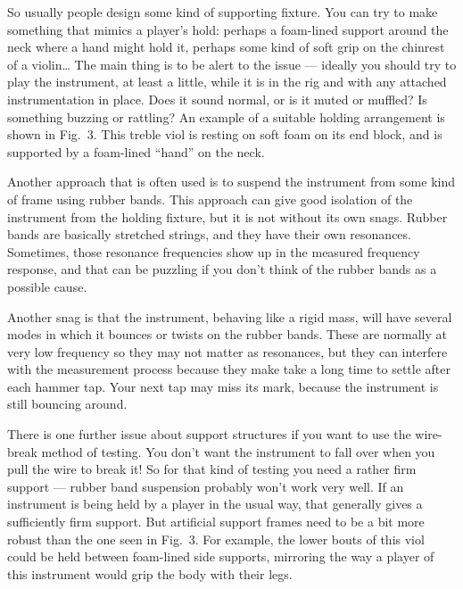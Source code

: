   So usually people design some kind of supporting fixture. You can try to make 
  something that mimics a player’s hold: perhaps a foam-lined support around 
  the neck where a hand might hold it, perhaps some kind of soft grip on the 
  chinrest of a violin… The main thing is to be alert to the issue — ideally 
  you should try to play the instrument, at least a little, while it is in the 
  rig and with any attached instrumentation in place. Does it sound normal, or 
  is it muted or muffled? Is something buzzing or rattling? An example of a 
  suitable holding arrangement is shown in Fig.\ 3. This treble viol is resting 
  on soft foam on its end block, and is supported by a foam-lined ``hand'' on 
  the neck. 


  Another approach that is often used is to suspend the instrument from some 
  kind of frame using rubber bands. This approach can give good isolation of 
  the instrument from the holding fixture, but it is not without its own snags. 
  Rubber bands are basically stretched strings, and they have their own 
  resonances. Sometimes, those resonance frequencies show up in the measured 
  frequency response, and that can be puzzling if you don't think of the rubber 
  bands as a possible cause. 

  Another snag is that the instrument, behaving like a rigid mass, will have 
  several modes in which it bounces or twists on the rubber bands. These are 
  normally at very low frequency so they may not matter as resonances, but they 
  can interfere with the measurement process because they make take a long time 
  to settle after each hammer tap. Your next tap may miss its mark, because the 
  instrument is still bouncing around. 

  There is one further issue about support structures if you want to use the 
  wire-break method of testing. You don't want the instrument to fall over when 
  you pull the wire to break it! So for that kind of testing you need a rather 
  firm support --- rubber band suspension probably won't work very well. If an 
  instrument is being held by a player in the usual way, that generally gives a 
  sufficiently firm support. But artificial support frames need to be a bit 
  more robust than the one seen in Fig.\ 3. For example, the lower bouts of 
  this viol could be held between foam-lined side supports, mirroring the way a 
  player of this instrument would grip the body with their legs. 

